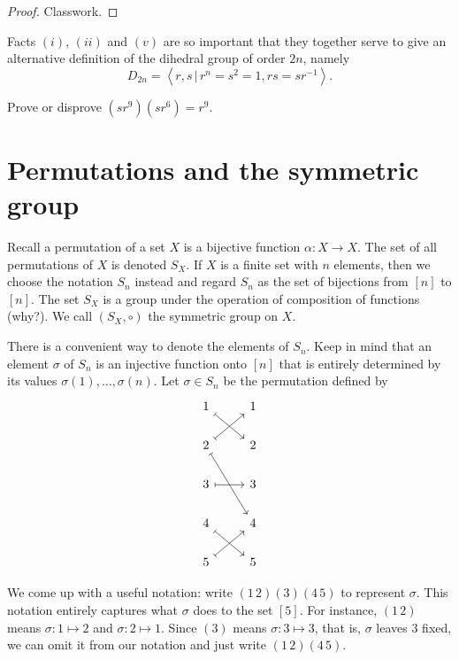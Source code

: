 \documentclass[11pt,a4paper]{article}
\begin{document}
\begin{proof}
    Classwork.
\end{proof}

\begin{rem}
    Facts \((i)\), \((ii)\) and \((v)\) are so important that they together serve to give an alternative definition of the dihedral group of order \(2n\), namely 
    \[D_{2 n}=\left\langle r, s \, \bigg|\,  r^n=s^2=1, r s=s r^{-1}\right\rangle.\]
\end{rem}

\begin{eje}
    Prove or disprove \((sr^9) (sr^6) = r^9\).
\end{eje}


\section{Permutations and the symmetric group}

Recall a permutation of a set \(X\) is a bijective function \(\alpha\colon X\to X\).
The set of all permutations of \(X \) is denoted \(S_X\).
If \(X\) is a finite set with \(n\) elements, then we choose the notation \( S_n\) instead and regard \(S_n\) as the set of bijections from \([n]\) to \([n]\).
The set \(S_X\) is a group under the operation of  composition of functions (why?).
We call \((S_X,\circ )\) the symmetric group on  \(X\).


There is a convenient way to denote the elements of \(S_n\). Keep in mind that an element \(\sigma\) of \(S_n\) is an injective function onto \([n]\) that is entirely determined by its values \(\sigma(1), \ldots,\sigma(n)\).
Let \(\sigma\in S_n\) be the permutation defined by 
\[\begin{tikzcd}
1 \arrow[rd, maps to]                      & 1 \\
2 \arrow[rdd, maps to] \arrow[ru, maps to] & 2 \\
3 \arrow[r, maps to]                       & 3 \\
4 \arrow[rd, maps to]                      & 4 \\
5 \arrow[ru, maps to]                      & 5
\end{tikzcd}\]

We come up with a useful notation: write   \((1\, 2)(3)(4\, 5)\) to represent \(\sigma\). This notation entirely captures what \(\sigma\) does to the set \([5]\). For instance, \((1\, 2)\) means \(\sigma\colon 1 \mapsto 2\) and \(\sigma\colon 2\mapsto 1\). Since \((3)\) means \(\sigma\colon 3 \mapsto 3\), that is, \(\sigma\) leaves \(3\) fixed, we can omit it from our notation and just  write  \((1\, 2)(4\, 5)\).
\end{document}
